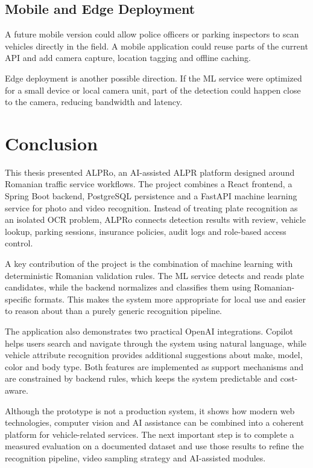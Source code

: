 ﻿\documentclass[12pt,a4paper]{article}
\begin{document}
\subsection{Mobile and Edge Deployment}

A future mobile version could allow police officers or parking inspectors to scan vehicles directly in the field. A mobile application could reuse parts of the current API and add camera capture, location tagging and offline caching.

Edge deployment is another possible direction. If the ML service were optimized for a small device or local camera unit, part of the detection could happen close to the camera, reducing bandwidth and latency.

\newpage
\section{Conclusion}

This thesis presented ALPRo, an AI-assisted ALPR platform designed around Romanian traffic service workflows. The project combines a React frontend, a Spring Boot backend, PostgreSQL persistence and a FastAPI machine learning service for photo and video recognition. Instead of treating plate recognition as an isolated OCR problem, ALPRo connects detection results with review, vehicle lookup, parking sessions, insurance policies, audit logs and role-based access control.

A key contribution of the project is the combination of machine learning with deterministic Romanian validation rules. The ML service detects and reads plate candidates, while the backend normalizes and classifies them using Romanian-specific formats. This makes the system more appropriate for local use and easier to reason about than a purely generic recognition pipeline.

The application also demonstrates two practical OpenAI integrations. Copilot helps users search and navigate through the system using natural language, while vehicle attribute recognition provides additional suggestions about make, model, color and body type. Both features are implemented as support mechanisms and are constrained by backend rules, which keeps the system predictable and cost-aware.

Although the prototype is not a production system, it shows how modern web technologies, computer vision and AI assistance can be combined into a coherent platform for vehicle-related services. The next important step is to complete a measured evaluation on a documented dataset and use those results to refine the recognition pipeline, video sampling strategy and AI-assisted modules.
\end{document}
